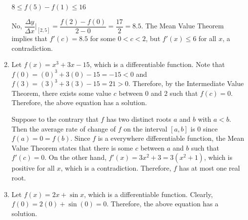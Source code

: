 \documentclass{book}
\begin{document}
\begin{appendices}
\begin{enumerate}[!HW!]
\begin{multicols}{2}
\itemspade $8\le f(5)-f(1)\le 16$
\end{multicols}
\itemspade 
\begin{pf}
No, $\dfrac{\Delta y}{\Delta x}\bigg|_{[2,5]} = \dfrac{f(2)-f(0)}{2-0} = \dfrac{17}{2} = 8.5$. The Mean Value Theorem implies that $f'(c) = 8.5$ for some $0<c<2$, but $f'(x) \le 6$ for all $x$, a contradiction.
\end{pf}

\item\begin{pf}
Let $f(x)=x^3+3x-15$, which is a differentiable function. Note that $f(0) = (0)^3+3(0)-15 = -15 < 0$ and $f(3) = (3)^3+3(3)-15 = 21 > 0$. Therefore, by the Intermediate Value Theorem, there exists some value $c$ between $0$ and $2$ such that $f(c) = 0$. Therefore, the above equation has a solution.

Suppose to the contrary that $f$ has two distinct roots $a$ and $b$ with $a< b$. Then the average rate of change of $f$ on the interval $[a,b]$ is 0 since $f(a) = 0 = f(b)$. Since $f$ is a everywhere differentiable function, the Mean Value Theorem states that there is some $c$ between $a$ and $b$ such that $f'(c) = 0$. On the other hand, $f'(x) = 3x^2+3 = 3(x^2+1)$, which is positive for all $x$, which is a contradiction. Therefore, $f$ has at most one real root.
\end{pf}

\item\begin{pf}
Let $f(x)=2x+\sin x$, which is a differentiable function. Clearly, $f(0) = 2(0)+\sin(0) = 0$. Therefore, the above equation has a solution.


\end{pf}
\end{enumerate}
\end{appendices}
\end{document}
